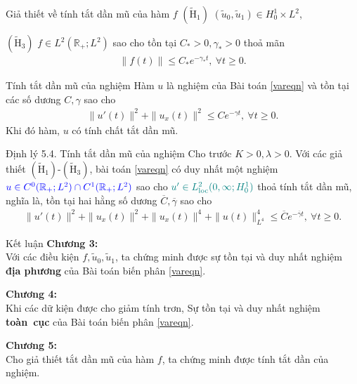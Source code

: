 \documentclass[9pt]{beamer}
\begin{document}
\begin{frame}
    \begin{block}{Giả thiết về tính tắt dần mũ của hàm $f$}
    $(\tilde{\text{H}}_1)$ $(\tilde{u}_0, \tilde{u}_1) \in H^1_0 \times L^2$,

    $(\tilde{\text{H}}_3)$ $f \in L^2(\mathbb{R}_{+}; L^2)$ sao cho tồn tại $C_* > 0, \gamma_* > 0$ thoả mãn
    \begin{align}
        \|f(t)\| \le C_* e^{-\gamma_* t}, \  \forall t \ge 0.
    \end{align}
    \end{block}

    \begin{block}{Tính tắt dần mũ của nghiệm}
    Hàm $u$ là nghiệm của Bài toán \eqref{vareqn} và tồn tại các số dương $C, \gamma$ sao cho
    \begin{align}
        \|u'(t)\|^2 + \|u_x(t)\|^2 \le C e^{-\gamma t}, \ \forall t \ge 0.
    \end{align}
    Khi đó hàm, $u$ có tính chất tắt dần mũ.
    \end{block}

    \begin{block}{Định lý 5.4. Tính tắt dần mũ của nghiệm}
        Cho trước $K > 0, \lambda > 0$. Với các giả thiết $(\tilde{\text{H}}_1)$-$(\tilde{\text{H}}_3)$, bài toán \eqref{vareqn} có duy nhất một nghiệm $\color{blue} u \in C^0(\mathbb{R}_{+}; L^2) \cap C^1(\mathbb{R}_{+}; L^2)$ sao cho $\color{teal} u' \in L^2_{\text{loc}}(0,\infty; H^1_0)$ thoả tính tắt dần mũ, nghĩa là, tồn tại hai hằng số dương $\overline{C}, \overline{\gamma}$ sao cho
        \begin{align}
            \|u'(t)\|^2 + \|u_x(t)\|^2 + \|u_x(t)\|^4 + \|u(t)\|^4_{L^4} \le \overline{C} e^{-\overline{\gamma} t}, \  \forall t \ge 0.
        \end{align}
    \end{block}
\end{frame}

\begin{frame}{Kết luận}
    \textbf{Chương 3:} \\
    Với các điều kiện $f, \tilde{u}_0, \tilde{u}_1$, ta chứng minh được sự tồn tại và duy nhất nghiệm \textbf{địa phương} của Bài toán biến phân \eqref{vareqn}.
    \vspace{0.3cm}
    
    \textbf{Chương 4:} \\
    Khi các dữ kiện được cho giảm tính trơn, Sự tồn tại và duy nhất nghiệm \textbf{toàn~cục} của Bài toán biến phân \eqref{vareqn}.
     \vspace{0.3cm}
     
    \textbf{Chương 5:} \\
    Cho giả thiết tắt dần mũ của hàm $f$, ta chứng minh được tính tắt dần của nghiệm.
\end{frame}
\end{document}
